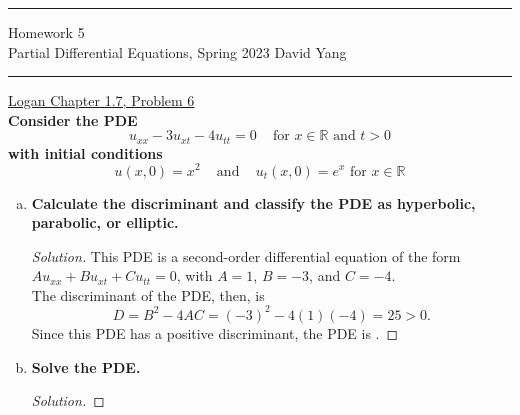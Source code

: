 \documentclass[11pt]{article}
\newenvironment{solution}
  {\renewcommand\qedsymbol{$\blacksquare$}\begin{proof}[Solution]}
  {\end{proof}}
\begin{document}
	\hrule
	\begin{center}
		{\Large Homework 5} \\ %
		\vspace{0.2cm}
		Partial Differential Equations, Spring 2023 \hfill David Yang %
	\end{center}

\hrule

\vspace{1em}

\underline{Logan Chapter 1.7, Problem 6} \\

\textbf{Consider the PDE \[u_{xx} - 3u_{xt} - 4u_{tt} = 0 \, \, \, \, \, \text{ for } x \in \mathbb{R} \text { and } t > 0\] with initial conditions 
\[u(x, 0) = x^2 \, \, \, \, \, \text{ and } \, \, \, \, \, u_t(x, 0) = e^x \text{ for } x \in \mathbb{R}\]}
\begin{enumerate}[a)]
\item \textbf{Calculate the discriminant and classify the PDE as hyperbolic, parabolic, or elliptic.} 
\begin{solution}
This PDE is a second-order differential equation of the form $Au_{xx} + Bu_{xt} + Cu_{tt} = 0$, with $A = 1$, $B = -3$, and $C=-4.$ \\

The discriminant of the PDE, then, is \[D = B^2 - 4AC = (-3)^2 - 4(1)(-4) = \boxed{25} > 0.\]
Since this PDE has a positive discriminant, the PDE is .
\end{solution}

\item \textbf{Solve the PDE.}
\begin{solution}

\end{solution}
\end{enumerate}
\end{document}
